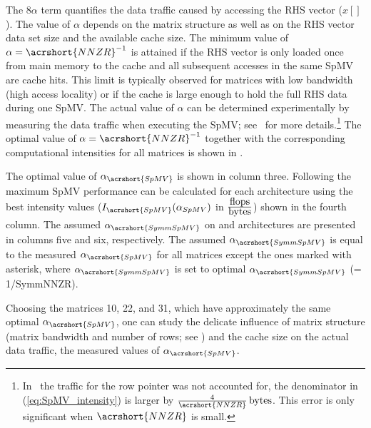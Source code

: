 The $8\alpha$ term quantifies the data traffic caused by accessing the
RHS vector ($x[]$). The value of $\alpha$ depends on
the matrix structure as well as on the RHS vector data set size and
the available cache size. The minimum value of
$\alpha=\acrshort{NNZR}^{-1}$ is attained if the RHS vector is only
loaded once from main memory to the cache and all subsequent accesses
in the same \acrshort{SpMV} are cache hits. This limit is typically
observed for matrices with low bandwidth (high access locality) or if
the cache is large enough to hold the full RHS data during
one \acrshort{SpMV}. The actual value of $\alpha$ can be determined
experimentally by measuring the data traffic when executing
the \acrshort{SpMV}; see~\cite{Moritz_sell} for more
details.\footnote{In~\cite{Moritz_sell} the traffic for the row
pointer was not accounted for, \ie the denominator in
(\ref{eq:SpMV_intensity}) is larger by
$\frac{4}{\acrshort{NNZR}}\,\BYTE$. This error is only significant
when $\acrshort{NNZR}$ is small.}  The optimal value of
$\alpha=\acrshort{NNZR}^{-1}$ together with the corresponding
computational intensities for all matrices is shown in 
. 
\begin{table}[t]
	\centering
	\caption{The optimal value of $\alpha_{\acrshort{SpMV}}$
	is shown in column three. Following  the
	maximum \acrshort{SpMV} performance can be calculated for each
	architecture using the best intensity values
	($I_{\acrshort{SpMV}}(\alpha_{SpMV})$ in
	$\frac{\mbox{flops}}{\mbox{bytes}}$) shown in the fourth
	column. The assumed $\alpha_{\acrshort{SymmSpMV}}$ on \SKX and 
	\IVB architectures are presented in columns five and six, respectively.
	The assumed $\alpha_{\acrshort{SymmSpMV}}$ is equal to 
	the measured $\alpha_{\acrshort{SpMV}}$ for all matrices
	except the ones marked with asterisk, where  $\alpha_{\acrshort{SymmSpMV}}$
	is set to optimal $\alpha_{\acrshort{SymmSpMV}}$ (= 1/\acrshort{SymmNNZR}).
	 \label{table:alpha_values}}
    \begin{center} 
      
    \end{center}
\end{table}
Choosing the matrices 10, 22, and 31, which have approximately the
same optimal $\alpha_{\acrshort{SpMV}}$, one can study the delicate
influence of matrix structure (\ie matrix bandwidth and number of
rows; see ) and the cache size on the actual data
traffic, \ie the measured values of $\alpha_{\acrshort{SpMV}}$.
 
